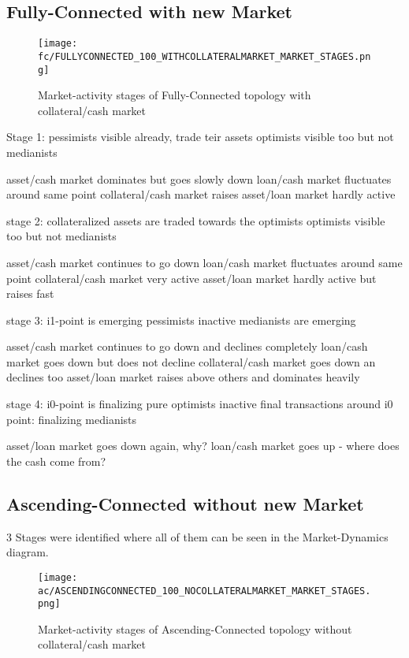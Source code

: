 \documentclass[Bachelorarbeit.tex]{subfiles}
\begin{document}
\subsection{Fully-Connected with new Market}

\begin{figure}[H]
	\centering
  \texttt{[image: fc/FULLYCONNECTED\_100\_WITHCOLLATERALMARKET\_MARKET\_STAGES.png]}
  	\caption{Market-activity stages of Fully-Connected topology with collateral/cash market}
	\label{fig:markets_FULLYCONNECTED_100_WITHCOLLATERALMARKET_MARKET_STAGES}
\end{figure}

Stage 1:
pessimists visible already, trade teir assets
optimists visible too but not medianists

asset/cash market dominates but goes slowly down
loan/cash market fluctuates around same point
collateral/cash market raises
asset/loan market hardly active

stage 2:
collateralized assets are traded towards the optimists
optimists visible too but not medianists

asset/cash market continues to go down
loan/cash market fluctuates around same point
collateral/cash market very active
asset/loan market hardly active but raises fast

stage 3:
i1-point is emerging
pessimists inactive
medianists are emerging

asset/cash market continues to go down and declines completely
loan/cash market goes down but does not decline
collateral/cash market goes down an declines too
asset/loan market raises above others and dominates heavily

stage 4:
i0-point is finalizing
pure optimists inactive
final transactions around i0 point: finalizing medianists

asset/loan market goes down again, why?
loan/cash market goes up - where does the cash come from?



\subsection{Ascending-Connected without new Market}

3 Stages were identified where all of them can be seen in the Market-Dynamics diagram.

\begin{figure}[H]
	\centering
  \texttt{[image: ac/ASCENDINGCONNECTED\_100\_NOCOLLATERALMARKET\_MARKET\_STAGES.png]}
  	\caption{Market-activity stages of Ascending-Connected topology without collateral/cash market}
	\label{fig:markets_ASCENDINGCONNECTED_100_NOCOLLATERALMARKET_MARKET_STAGES}
\end{figure}
\end{document}
